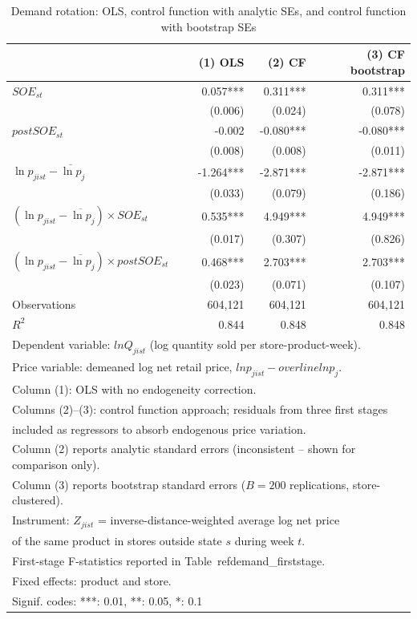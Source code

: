 \begin{table}[!h]
\centering
\caption{\label{tab:tab:demand_cf}Demand rotation: OLS, control function with analytic SEs, and control function with bootstrap SEs}
\centering
\begin{tabular}[t]{lrrr}
\toprule
 & (1) OLS & (2) CF & (3) CF bootstrap\\
\midrule
$SOE_{st}$ & 0.057*** & 0.311*** & 0.311***\\
 & (0.006) & (0.024) & (0.078)\\
$postSOE_{st}$ & -0.002 & -0.080*** & -0.080***\\
 & (0.008) & (0.008) & (0.011)\\
$\ln p_{jist} - \overline{\ln p}_{j}$ & -1.264*** & -2.871*** & -2.871***\\
\addlinespace
 & (0.033) & (0.079) & (0.186)\\
$(\ln p_{jist} - \overline{\ln p}_{j}) \times SOE_{st}$ & 0.535*** & 4.949*** & 4.949***\\
 & (0.017) & (0.307) & (0.826)\\
$(\ln p_{jist} - \overline{\ln p}_{j}) \times postSOE_{st}$ & 0.468*** & 2.703*** & 2.703***\\
 & (0.023) & (0.071) & (0.107)\\
\midrule
\addlinespace
Observations & 604,121 & 604,121 & 604,121\\
$R^2$ & 0.844 & 0.848 & 0.848\\
\bottomrule
\multicolumn{4}{l}{\rule{0pt}{1em}Dependent variable: $ln Q_{jist}$ (log quantity sold per store-product-week).}\\
\multicolumn{4}{l}{\rule{0pt}{1em}Price variable: demeaned log net retail price, $ln p_{jist} - overline{ln p}_{j}$.}\\
\multicolumn{4}{l}{\rule{0pt}{1em}Column (1): OLS with no endogeneity correction.}\\
\multicolumn{4}{l}{\rule{0pt}{1em}Columns (2)--(3): control function approach; residuals from three first stages}\\
\multicolumn{4}{l}{\rule{0pt}{1em}included as regressors to absorb endogenous price variation.}\\
\multicolumn{4}{l}{\rule{0pt}{1em}Column (2) reports analytic standard errors (inconsistent -- shown for comparison only).}\\
\multicolumn{4}{l}{\rule{0pt}{1em}Column (3) reports bootstrap standard errors ($B = 200$ replications, store-clustered).}\\
\multicolumn{4}{l}{\rule{0pt}{1em}Instrument: $Z_{jist}$ = inverse-distance-weighted average log net price}\\
\multicolumn{4}{l}{\rule{0pt}{1em}of the same product in stores outside state $s$ during week $t$.}\\
\multicolumn{4}{l}{\rule{0pt}{1em}First-stage F-statistics reported in Table~ref{demand_firststage}.}\\
\multicolumn{4}{l}{\rule{0pt}{1em}Fixed effects: product and store.}\\
\multicolumn{4}{l}{\rule{0pt}{1em}Signif. codes: ***: 0.01, **: 0.05, *: 0.1}\\
\end{tabular}
\end{table}
